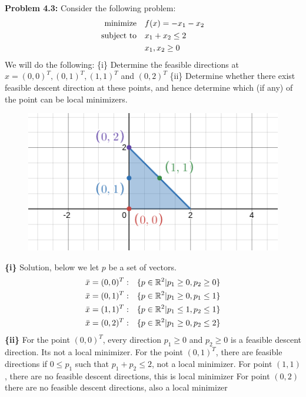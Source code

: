 \documentclass{article}
\begin{document}
\textbf{Problem 4.3:} Consider the following problem: 
\begin{align*}
    \text{minimize} &\null \quad f(x) = -x_1 - x_2 \\ 
    \text{subject to} &\null \quad x_1 + x_2 \leq 2 \\
     &\null \quad x_1, x_2 \geq 0
\end{align*}
We will do the following: \newline \setlength\parindent{24pt}  
\indent \{i\} Determine the feasible directions at  $x = (0,0)^T, (0,1)^T, (1,1)^T$ and $(0,2)^T$ \newline 
\indent \{ii\} Determine whether there exist feasible descent direction at these points, and hence determine which (if any) of the point can be local minimizers. 
\newline 
\begin{figure}[H]
    \centering
    \includegraphics[scale = 0.40]{desmos2.png}
\end{figure}
\indent \textbf{\{i\}} Solution, below we let $p$ be a set of vectors.
\begin{align*}
    \bar{x} = (0,0)^T: &\null \quad \{p \in \mathbb{R}^2 | p_1 \geq 0, p_2 \geq 0 \} \\
    \bar{x} = (0,1)^T: &\null \quad \{p \in \mathbb{R}^2 | p_1 \geq 0, p_1 \leq 1 \} \\
    \bar{x} = (1,1)^T: &\null \quad \{p \in \mathbb{R}^2 | p_1 \leq 1,  p_2 \leq 1 \} \\
    \bar{x} = (0,2)^T: &\null \quad \{p \in \mathbb{R}^2 | p_1 \geq 0, p_2 \leq 2 \} \\
\end{align*}
\indent \textbf{\{ii\}} \newline For the point $(0,0)^T$, every direction $p_1 \geq 0$ and $p_2 \geq 0$ is a feasible descent direction. Its not a local minimizer. \newline
For the point $(0,1)^T$, there are feasible directions if $0 \leq p_1 $ such that $p_1 + p_2 \leq 2$, not a local minimizer. \newline
For point $(1,1)$, there are no feasible descent directions, this is local minimizer \newline
For point $(0,2)$ there are no feasible descent directions, also a local minimizer \newline
\end{document}
